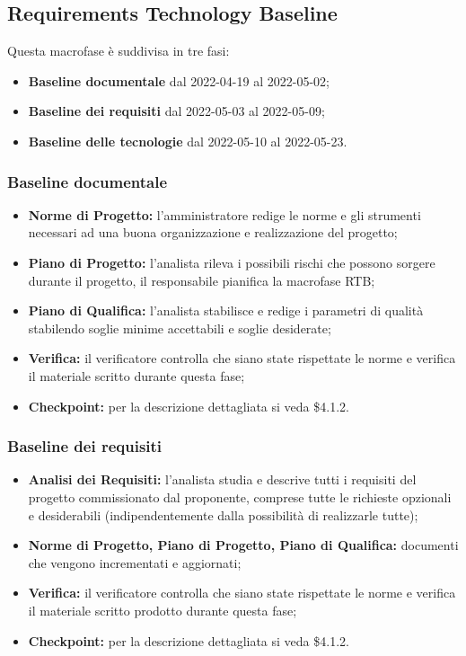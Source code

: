 \subsection{Requirements Technology Baseline}
Questa macrofase è suddivisa in tre fasi:
\begin{itemize}
    \item \textbf{Baseline documentale} dal 2022-04-19 al 2022-05-02;
    \item \textbf{Baseline dei requisiti} dal 2022-05-03 al 2022-05-09;
    \item \textbf{Baseline delle tecnologie} dal 2022-05-10 al 2022-05-23.
\end{itemize}

\subsubsection{Baseline documentale}
\begin{itemize}
    \item \textbf{Norme di Progetto:} l'amministratore redige le norme e gli strumenti necessari ad una buona organizzazione e realizzazione del progetto;
    \item \textbf{Piano di Progetto:} l'analista rileva i possibili rischi che possono sorgere durante il progetto, il responsabile pianifica la macrofase RTB;
    \item \textbf{Piano di Qualifica:} l'analista stabilisce e redige i parametri di qualità stabilendo soglie minime accettabili e soglie desiderate; 
    \item \textbf{Verifica:} il verificatore controlla che siano state rispettate le norme e verifica il materiale scritto durante questa fase;
    \item \textbf{Checkpoint:} per la descrizione dettagliata si veda \$4.1.2. 
\end{itemize}

\subsubsection{Baseline dei requisiti}
\begin{itemize}
    \item \textbf{Analisi dei Requisiti:} l'analista studia e descrive tutti i requisiti del progetto commissionato dal proponente, 
                comprese tutte le richieste opzionali e desiderabili (indipendentemente dalla possibilità di realizzarle tutte);
    \item \textbf{Norme di Progetto, Piano di Progetto, Piano di Qualifica:} documenti che vengono incrementati e aggiornati;
    \item \textbf{Verifica:} il verificatore controlla che siano state rispettate le norme e verifica il materiale scritto prodotto durante questa fase;
    \item \textbf{Checkpoint:} per la descrizione dettagliata si veda \$4.1.2.
\end{itemize}


